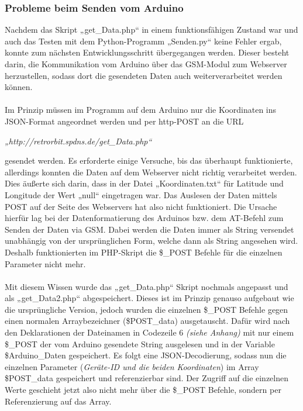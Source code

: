 \subsubsection{Probleme beim Senden vom Arduino }
Nachdem das Skript „get\_Data.php“ in einem funktionsfähigen Zustand war und auch das Testen mit dem Python-Programm „Senden.py“ keine Fehler ergab, konnte zum nächsten Entwicklungsschritt übergegangen werden. Dieser besteht darin, die Kommunikation vom Arduino über das GSM-Modul zum Webserver herzustellen, sodass dort die gesendeten Daten auch weiterverarbeitet werden können.
\\
\\
Im Prinzip müssen im Programm auf dem Arduino nur die Koordinaten ins JSON-Format angeordnet werden und per http-POST an die URL
\begin{center}
	\textit{„http://retrorbit.spdns.de/get\_Data.php“}
\end{center}
 gesendet werden. Es erforderte einige Versuche, bis das überhaupt funktionierte, allerdings konnten die Daten auf dem Webserver nicht richtig verarbeitet werden. Dies äußerte sich darin, dass in der Datei „Koordinaten.txt“ für Latitude und Longitude der Wert „null“ eingetragen war. Das Auslesen der Daten mittels POST auf der Seite des Webservers hat also nicht funktioniert. Die Ursache hierfür lag bei der Datenformatierung des Arduinos bzw. dem AT-Befehl zum Senden der Daten via GSM. Dabei werden die Daten immer als String versendet unabhängig von der ursprünglichen Form, welche dann als String angesehen wird. Deshalb funktionierten im PHP-Skript die \$\_POST Befehle für die einzelnen Parameter nicht mehr.
\\
\\
Mit diesem Wissen wurde das „get\_Data.php“ Skript nochmals angepasst und als „get\_Data2.php“ abgespeichert. Dieses ist im Prinzip genauso aufgebaut wie die ursprüngliche Version, jedoch wurden die einzelnen \$\_POST Befehle gegen einen normalen Arraybezeichner (\$POST\_data) ausgetauscht. Dafür wird nach den Deklarationen der Dateinamen in Codezeile 6 \textit{(siehe Anhang)} mit nur einem  \$\_POST der vom Arduino gesendete String ausgelesen und in der Variable \$Arduino\_Daten gespeichert. Es folgt eine JSON-Decodierung, sodass nun die einzelnen Parameter (\textit{Geräte-ID und die beiden Koordinaten}) im Array \$POST\_data gespeichert und referenzierbar sind. Der Zugriff auf die einzelnen Werte geschieht jetzt also nicht mehr über die \$\_POST Befehle, sondern per Referenzierung auf das Array.

